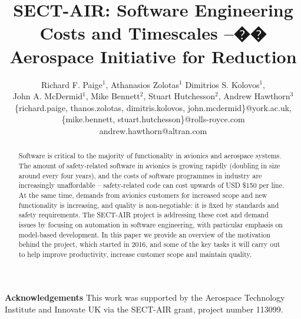 \documentclass[runningheads,a4paper]{llncs}
\begin{document}
\title{SECT-AIR: Software Engineering Costs and Timescales --�� Aerospace Initiative for Reduction}

\author{Richard F. Paige$^{1}$, Athanasios Zolotas$^{1}$ Dimitrios S. Kolovos$^{1}$, \\ John A. McDermid$^{1}$,
Mike Bennett$^{2}$, Stuart Hutchesson$^{2}$, Andrew Hawthorn$^{3}$\\%
%
\footnotesize{
\{richard.paige, thanos.zolotas, dimitris.kolovos, john.mcdermid\}@york.ac.uk, \\
\{mike.bennett, stuart.hutchesson\}@rolls-royce.com\\
andrew.hawthorn@altran.com
}
%
}

\maketitle

\begin{abstract}
Software is critical to the majority of functionality in avionics and aerospace systems. The amount of safety-related software in avionics is growing rapidly (doubling in size around every four years), and the costs of software programmes in industry are increasingly unaffordable -- safety-related code can cost upwards of USD \$150 per line. At the same time, demands from avionics customers for increased scope and new functionality is increasing, and quality is non-negotiable: it is fixed by standards and safety requirements. The SECT-AIR project is addressing these cost and demand issues by focusing on automation in software engineering, with particular emphasis on model-based development. In this paper we provide an overview of the motivation behind the project, which started in 2016, and some of the key tasks it will carry out to help improve productivity, increase customer scope and maintain quality.
\end{abstract}












\paragraph*{}\textbf{Acknowledgements} This work was supported by the Aerospace Technology Institute and Innovate UK via the SECT-AIR grant, project number 113099.


\end{document}
